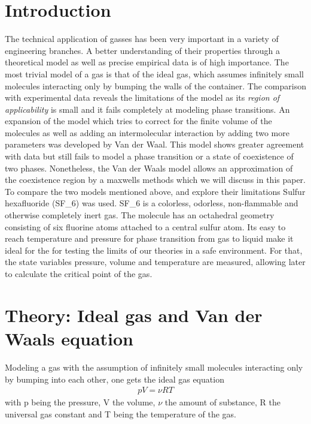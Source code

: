 \documentclass[a4paper,10pt,twocolumn]{article}
\begin{document}
    \section{Introduction}\label{sec:introdction}
    The technical application of gasses has been very important in a variety of engineering branches. 
    A better understanding of their properties through a  theoretical model as well as precise empirical data is of high importance.
    The most trivial model of a gas is that of the ideal gas, which assumes infinitely small molecules interacting only by bumping the walls of the container.
    The comparison with experimental data reveals the limitations of the model as its \textit{region of applicability} is small and it fails completely at modeling phase transitions.
    An expansion of the model which tries to correct for the finite volume of the molecules as well as adding an intermolecular interaction by adding two more parameters was developed by Van der Waal.
    This model shows greater agreement with data but still fails to model a phase transition or a state of coexistence of two phases.
    Nonetheless, the Van der Waals model allows an approximation of the coexistence region by a maxwells methods which we will discuss in this paper.
    To compare the two models mentioned above, and explore their limitations Sulfur hexafluoride (SF_6\)) was used.
    SF_6\) is a colorless, odorless, non-flammable and otherwise completely inert gas. 
    The molecule has an octahedral geometry consisting of six fluorine atoms attached to a central sulfur atom.
    Its easy to reach temperature and pressure for phase transition from gas to liquid make it ideal for the for testing the limits of our theories in a safe environment.
    For that, the state variables pressure, volume and temperature are measured, allowing later to calculate the critical point of the gas.
    \section{Theory: Ideal gas and Van der Waals equation}\label{sec:theory}
    Modeling a gas with the assumption of infinitely small molecules interacting only by bumping into each other, one gets the ideal gas equation
    \begin{align}
        pV=\nu RT
    \end{align}
    with p being the pressure, V the volume, $\nu$ the amount of substance, R the universal gas constant and T being the temperature of the gas.
    
\end{document}

